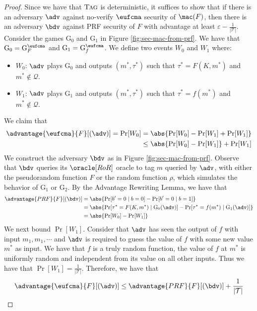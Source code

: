 \documentclass[11pt,a4paper]{article}
\newcommand{\Tag}{\textsc{Tag}}
\begin{document}
\begin{proof}
Since we have that $\Tag$ is deterministic, it suffices to show that if there is an adversary $\adv$ against no-verify $\eufcma$ security of $\mac(F)$, then there is an adversary $\bdv$ against PRF security of $F$ with advantage at least $\varepsilon-\frac{1}{|\mathcal{T}|}$. Consider the games $\mathrm{G}_0$ and $\mathrm{G}_1$ in Figure \ref{fig:sec-mac-from-prf}. We have that $\mathrm{G}_0 = \mathrm{G}^\eufcma_F$ and $\mathrm{G}_1 = \mathrm{G}^\eufcma_f$.
We define two events $W_0$ and $W_1$ where:
\begin{itemize}
	\item $W_0$: $\adv$ plays $\mathrm{G}_0$ and outputs $(m^*, \tau^*)$ such that $\tau^* = F(K, m^*)$ and $m^* \not \in \mathcal{Q}$. 
	\item $W_1$: $\adv$ plays $\mathrm{G}_1$ and outputs $(m^*, \tau^*)$ such that $\tau^* = f(m^*)$ and $m^* \not\in \mathcal{Q}$. 
\end{itemize}
We claim that 
$$
\begin{aligned}
\advantage{\eufcma}{F}[(\adv)] = \Pr[W_0] &= \abs{\Pr[W_0] - \Pr[W_1] + \Pr[W_1] } \\
&\leq \abs{\Pr[W_0] - \Pr[W_1]} + \Pr[W_1] 
\end{aligned}
$$
We construct the adversary $\bdv$ as in Figure \ref{fig:sec-mac-from-prf}. Observe that $\bdv$ queries its $\oracle[RoR]$ oracle to tag $m$ queried by $\adv$, with either the pseudorandom function $F$ or the random function $\rho$, which simulates the behavior of $\mathrm{G}_1$ or $\mathrm{G}_2$. By the Advantage Rewriting Lemma, we have that 
$$
\begin{aligned}
\advantage{PRF}{F}[(\bdv)] &= \abs{\Pr[b' = 0 \mid b = 0] - \Pr[b'=0 \mid b=1]} \\
&= \abs{\Pr[\tau^* = F(K, m^*) \mid \mathrm{G}_0(\adv)] -  \Pr[\tau^* = f(m^*) \mid \mathrm{G}_1(\adv)]} \\
&= \abs{\Pr[W_0] - \Pr[W_1]}
\end{aligned}
$$
We next bound $\Pr[W_1]$. Consider that $\adv$ has seen the output of $f$ with input $m_1, m_1, \cdots$ and $\adv$ is required to guess the  value of $f$ with some new value $m^*$ as input. We have that $f$ is a truly random function, the value of $f$ at $m^*$ is uniformly random and independent from its value on all other inputs. Thus we have that $\Pr[W_1] = \frac{1}{|\mathcal{T}|}$. 
Therefore, we have that 
$$
\advantage{\eufcma}{F}[(\adv)] \leq \advantage{PRF}{F}[(\bdv)] + \frac{1}{|\mathcal{T}|}
$$

\end{proof}
\end{document}
